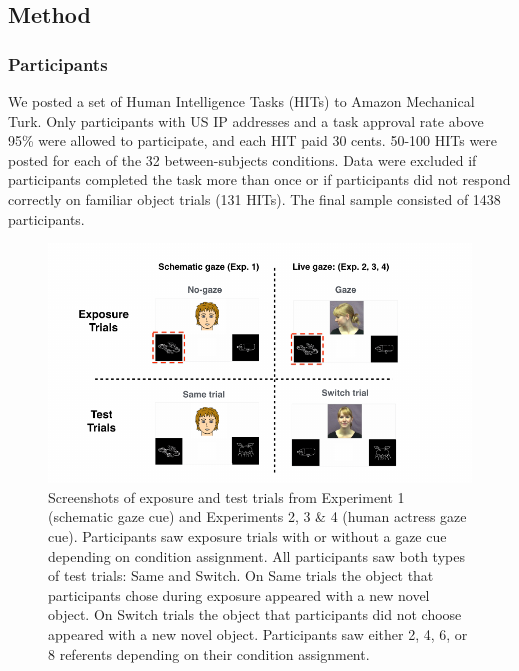 \documentclass[authoryear, review]{elsarticle}
\newenvironment{CodeChunk}{}{}
\begin{document}
\subsection{Method}\label{method}

\subsubsection{Participants}\label{participants}

We posted a set of Human Intelligence Tasks (HITs) to Amazon Mechanical
Turk. Only participants with US IP addresses and a task approval rate
above 95\% were allowed to participate, and each HIT paid 30 cents.
50-100 HITs were posted for each of the 32 between-subjects conditions.
Data were excluded if participants completed the task more than once or
if participants did not respond correctly on familiar object trials (131
HITs). The final sample consisted of 1438 participants.

\begin{CodeChunk}
\begin{figure}[tb]
\includegraphics{figs/stimuli-1} \caption[Screenshots of exposure and test trials from Experiment 1 (schematic gaze cue) and Experiments 2, 3 \& 4 (human actress gaze cue)]{Screenshots of exposure and test trials from Experiment 1 (schematic gaze cue) and Experiments 2, 3 \& 4 (human actress gaze cue). Participants saw exposure trials with or without a gaze cue depending on condition assignment. All participants saw both types of test trials: Same and Switch. On Same trials the object that participants chose during exposure appeared with a new novel object. On Switch trials the object that participants did not choose appeared with a new novel object. Participants saw either 2, 4, 6, or 8 referents depending on their condition assignment.}\label{fig:stimuli}
\end{figure}
\end{CodeChunk}
\end{document}
